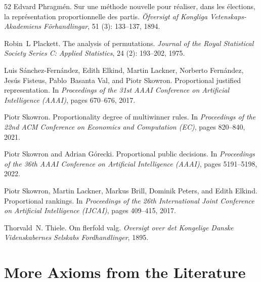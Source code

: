 \documentclass[10pt]{scrartcl}
\theoremstyle{plain}
\theoremstyle{definition}
\begin{document}
\begin{thebibliography}{52}
	Edvard Phragm{\'e}n.
	\newblock Sur une m{\'e}thode nouvelle pour r{\'e}aliser, dans les
	{\'e}lections, la repr{\'e}sentation proportionnelle des partis.
	\newblock \emph{\"Ofversigt af Kongliga Vetenskaps-Akademiens F\"orhandlingar},
	51 (3): 133--137, 1894.
	
	Robin~L Plackett.
	\newblock The analysis of permutations.
	\newblock \emph{Journal of the Royal Statistical Society Series C: Applied
		Statistics}, 24 (2): 193--202, 1975.
	
	Luis S{\'a}nchez-Fern{\'a}ndez, Edith Elkind, Martin Lackner, Norberto
	Fern{\'a}ndez, Jes{\'u}s Fisteus, Pablo~Basanta Val, and Piotr Skowron.
	\newblock Proportional justified representation.
	\newblock In \emph{Proceedings of the 31st AAAI Conference on Artificial
		Intelligence (AAAI)}, pages 670--676, 2017.
	
	Piotr Skowron.
	\newblock Proportionality degree of multiwinner rules.
	\newblock In \emph{Proceedings of the 22nd ACM Conference on Economics and
		Computation (EC)}, pages 820--840, 2021.
	
	Piotr Skowron and Adrian G{\'o}recki.
	\newblock Proportional public decisions.
	\newblock In \emph{Proceedings of the 36th AAAI Conference on Artificial
		Intelligence (AAAI)}, pages 5191--5198, 2022.
	
	Piotr Skowron, Martin Lackner, Markus Brill, Dominik Peters, and Edith Elkind.
	\newblock Proportional rankings.
	\newblock In \emph{Proceedings of the 26th International Joint Conference on
		Artificial Intelligence (IJCAI)}, pages 409--415, 2017.
	
	Thorvald~N. Thiele.
	\newblock Om flerfold valg.
	\newblock \emph{Oversigt over det Kongelige Danske Videnskabernes Selskabs
		Fordhandlinger}, 1895.
	
\end{thebibliography}


\appendix

\newpage 

\section{More Axioms from the Literature}
\end{document}
